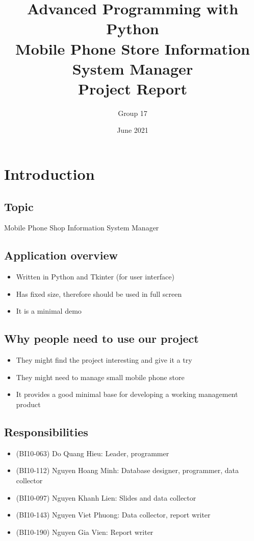 \documentclass[12pt,oneside,a4paper]{article}
\title{
  {\Large \textbf{Advanced Programming with Python}\\}
  {\Large \textbf{Mobile Phone Store Information System Manager}\\}
\bigskip
  {\Large \textbf{Project Report}\\}
}
\author{
  Group 17
  \vspace{2cm}
}
\date{June 2021}
\begin{document}
\begin{titlepage}
  \maketitle
  \thispagestyle{empty}
\end{titlepage}

\tableofcontents

\listoffigures

\newpage

\section{Introduction}
\subsection{Topic}
Mobile Phone Shop Information System Manager

\subsection{Application overview}
\begin{itemize}
  \item Written in Python and Tkinter (for user interface)
  \item Has fixed size, therefore should be used in full screen
  \item It is a minimal demo
\end{itemize}

\subsection{Why people need to use our project}
\begin{itemize}
  \item They might find the project interesting and give it a try
  \item They might need to manage small mobile phone store
  \item It provides a good minimal base for developing a working management product
\end{itemize}

\subsection{Responsibilities}
\begin{itemize}
  \item (BI10-063) Do Quang Hieu: Leader, programmer
  \item (BI10-112) Nguyen Hoang Minh: Database designer, programmer, data collector
  \item (BI10-097) Nguyen Khanh Lien: Slides and data collector
  \item (BI10-143) Nguyen Viet Phuong: Data collector, report writer
  \item (BI10-190) Nguyen Gia Vien: Report writer
\end{itemize}
\end{document}
